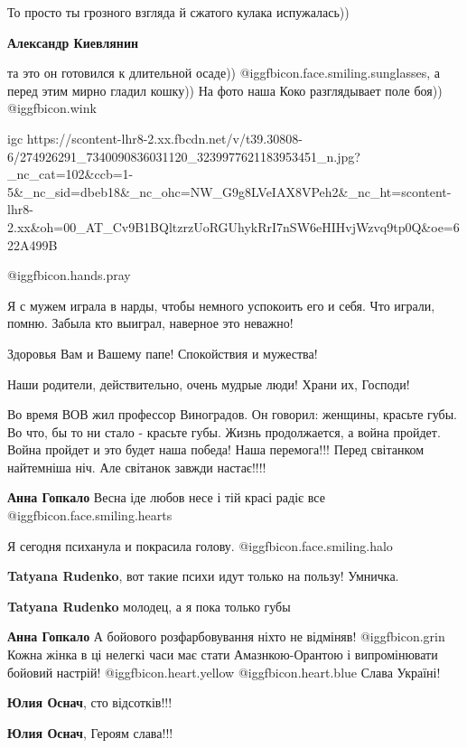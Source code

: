  
 
 
 
 

То просто ты грозного взгляда й сжатого кулака испужалась))

\textbf{Александр Киевлянин}

та это он готовился к длительной осаде)) @igg{fbicon.face.smiling.sunglasses},
а перед этим мирно гладил кошку)) На фото наша Коко разглядывает поле боя))
@igg{fbicon.wink} 

\ifcmt
  igc https://scontent-lhr8-2.xx.fbcdn.net/v/t39.30808-6/274926291_7340090836031120_3239977621183953451_n.jpg?_nc_cat=102&ccb=1-5&_nc_sid=dbeb18&_nc_ohc=NW_G9g8LVeIAX8VPeh2&_nc_ht=scontent-lhr8-2.xx&oh=00_AT_Cv9B1BQltzrzUoRGUhykRrI7nSW6eHIHvjWzvq9tp0Q&oe=622A499B
\fi

 @igg{fbicon.hands.pray} 

Я с мужем играла в нарды, чтобы немного успокоить его и себя. Что играли, помню. Забыла кто выиграл, наверное это неважно!

Здоровья Вам и Вашему папе! Спокойствия и мужества!

Наши родители, действительно, очень мудрые люди! Храни их, Господи!


Во время ВОВ жил профессор Виноградов. Он говорил: женщины, красьте губы. Во
что, бы то ни стало - красьте губы. Жизнь продолжается, а война пройдет. Война
пройдет и это будет наша победа! Наша перемога!!! Перед світанком найтемніша
ніч. Але світанок завжди настає!!!!

\begin{itemize} %
\textbf{Анна Гопкало}
Весна іде любов несе і тій красі радіє все @igg{fbicon.face.smiling.hearts} 

Я сегодня психанула и покрасила голову. @igg{fbicon.face.smiling.halo} 

\textbf{Tatyana Rudenko}, вот такие психи идут только на пользу! Умничка.

\textbf{Tatyana Rudenko} молодец, а я пока только губы

\textbf{Анна Гопкало} А бойового розфарбовування ніхто не відміняв! @igg{fbicon.grin}  Кожна жінка в ці нелегкі часи має стати Амазнкою-Орантою і випромінювати бойовий настрій!  @igg{fbicon.heart.yellow}  @igg{fbicon.heart.blue}  Слава Україні!

\textbf{Юлия Оснач}, сто відсотків!!!

\textbf{Юлия Оснач}, Героям слава!!!
\end{itemize} %

